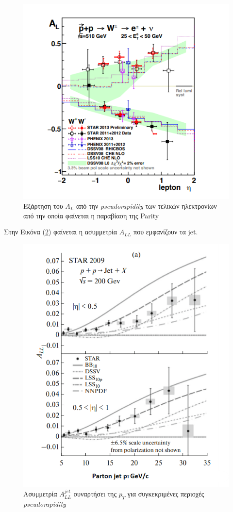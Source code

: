 	\begin{figure}[h!]
		\centering
		\includegraphics[scale=0.7]{STAR_Results/AL_parity_violation}
		\caption{Εξάρτηση του $A_L$ από την \textit{pseudorapidity} των τελικών ηλεκτρονίων από την οποία φαίνεται η παραβίαση της Parity}
		\label{fig4.18}
	\end{figure}
	
Στην Εικόνα (\ref{fig4.19}) φαίνεται η ασυμμετρία $A_{LL}$ που εμφανίζουν τα jet. 
	\begin{figure}[h!]
		\centering
		\includegraphics[scale=0.6]{STAR_Results/ALL_jet}
		\caption{Ασυμμετρία $A_{LL}^{jet}$ συναρτήσει της $p_T$ για συγκεκριμένες περιοχές \textit{pseudorapidity}}
		\label{fig4.19}
	\end{figure}
	
